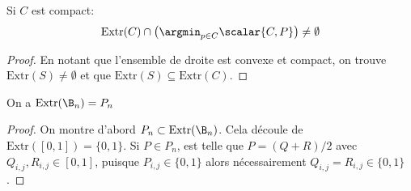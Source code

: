 \begin{proposition}
	Si $C$ est compact:
	\begin{equation*}
		\mathrm{Extr}(C) \cap \left(\argmin_{p\in C} \scalar{C, P}\right) \neq \emptyset
	\end{equation*}
\end{proposition}
\begin{proof}
	En notant que l'ensemble de droite est convexe et compact, on trouve $\mathrm{Extr}(S) \neq \emptyset$ et que
	$\mathrm{Extr}(S) \subseteq \mathrm{Extr}(C)$.
\end{proof}

\begin{thm}
	On a $\mathrm{Extr}(\B_{n}) = P_{n}$
\end{thm}
\begin{proof}
	On montre d'abord $P_n \subset \mathrm{Extr}(\B_n)$.
	Cela découle de $\text{Extr}([0,1]) = \{0,1\}$.
	Si $P \in P_n$, est telle que $P=(Q+R)/2$ avec $Q_{i,j},R_{i,j} \in [0,1]$, puisque $P_{i,j} \in \{0,1\}$ alors nécessairement $Q_{i,j}=R_{i,j} \in \{0,1\}$.


\end{proof}
